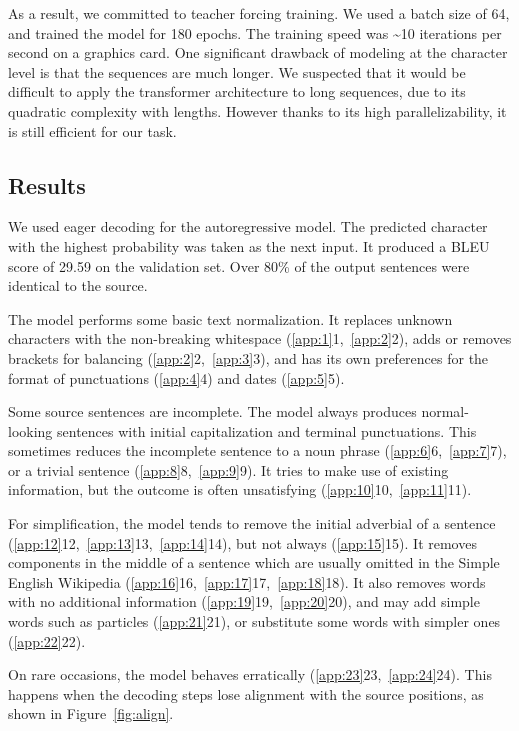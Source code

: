 \documentclass[11pt,twocolumn]{article}
\begin{document}
As a result, we committed to teacher forcing training.
We used a batch size of 64, and trained the model for 180 epochs.
The training speed was \textasciitilde{}10 iterations per second on a graphics card.
One significant drawback of modeling at the character level is that the sequences are much longer.
We suspected that it would be difficult to apply the transformer architecture to long sequences,
due to its quadratic complexity with lengths.
However thanks to its high parallelizability,
it is still efficient for our task.

\subsection{Results}

We used eager decoding for the autoregressive model.
The predicted character with the highest probability was taken as the next input.
It produced a BLEU score of 29.59 on the validation set.
Over 80\% of the output sentences were identical to the source.

The model performs some basic text normalization.
It replaces unknown characters with the non-breaking whitespace (\ref{app:1}{1},~\ref{app:2}{2}),
adds or removes brackets for balancing (\ref{app:2}{2},~\ref{app:3}{3}),
and has its own preferences for the format of punctuations (\ref{app:4}{4})
and dates (\ref{app:5}{5}).

Some source sentences are incomplete.
The model always produces normal-looking sentences with initial capitalization and terminal punctuations.
This sometimes reduces the incomplete sentence to a noun phrase (\ref{app:6}{6},~\ref{app:7}{7}),
or a trivial sentence (\ref{app:8}{8},~\ref{app:9}{9}).
It tries to make use of existing information,
but the outcome is often unsatisfying (\ref{app:10}{10},~\ref{app:11}{11}).

For simplification, the model tends to remove the initial adverbial of a sentence
(\ref{app:12}{12},~\ref{app:13}{13},~\ref{app:14}{14}),
but not always (\ref{app:15}{15}).
It removes components in the middle of a sentence
which are usually omitted in the Simple English Wikipedia
(\ref{app:16}{16},~\ref{app:17}{17},~\ref{app:18}{18}).
It also removes words with no additional information (\ref{app:19}{19},~\ref{app:20}{20}),
and may add simple words such as particles (\ref{app:21}{21}),
or substitute some words with simpler ones (\ref{app:22}{22}).

On rare occasions, the model behaves erratically (\ref{app:23}{23},~\ref{app:24}{24}).
This happens when the decoding steps lose alignment with the source positions,
as shown in Figure~\ref{fig:align}.
\end{document}
